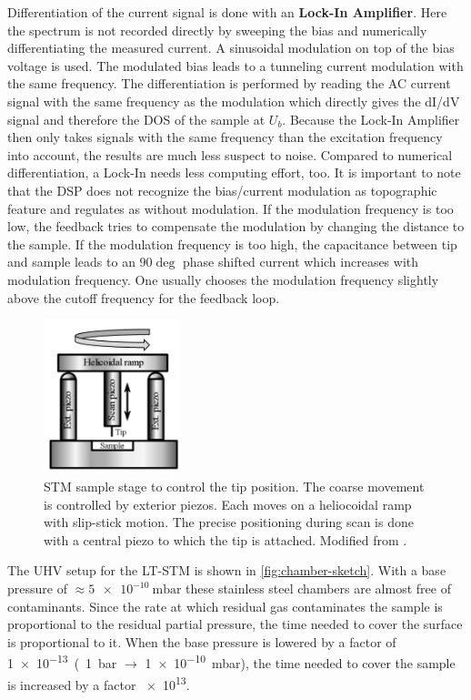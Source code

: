 Differentiation of the current signal is done with an \textbf{Lock-In Amplifier}. Here the spectrum is not recorded directly by sweeping the bias and numerically differentiating the measured current. A sinusoidal modulation on top of the bias voltage %
is used. The modulated bias leads to a tunneling current modulation with the same frequency. The differentiation is performed by reading the AC current signal with the same frequency as the modulation which directly gives the dI/dV signal and therefore the DOS of the sample at $U_b$. Because the Lock-In Amplifier then only takes signals with the same frequency than the excitation frequency into account, the results are much less suspect to noise. Compared to numerical differentiation, a Lock-In needs less computing effort, too. It is important to note that the DSP does not recognize the bias/current modulation as topographic feature and regulates as without modulation. If the modulation frequency is too low, the feedback tries to compensate the modulation by changing the distance to the sample. If the modulation frequency is too high, the capacitance between tip and sample leads to an $90\deg$ phase shifted current which increases with modulation frequency. One usually chooses the modulation frequency slightly above the cutoff frequency for the feedback loop.

\begin{figure} \centering
	\includegraphics[width=4cm]{./images/STM-sketch-2}
	\caption{STM sample stage to control the tip position. The coarse movement is controlled by exterior piezos. Each moves on a heliocoidal ramp with slip-stick motion. The precise positioning during scan is done with a central piezo to which the tip is attached. Modified from \cite{heliocoidal_ramp_2018}.}
	\label{fig:stm-heliocoidal-ramp}
\end{figure}

The UHV setup for the LT-STM is shown in \autoref{fig:chamber-sketch}. With a base pressure of $\approx \SI{5e-10}{\milli \bar}$ these stainless steel chambers are almost free of contaminants. Since the rate at which residual gas contaminates the sample is proportional to the residual partial pressure, the time needed to cover the surface is proportional to it. When the base pressure is lowered by a factor of \SI{1e-13} (\SI{1}{\bar} $\rightarrow$ \SI{1e-10}{\milli \bar}), the time needed to cover the sample is increased by a factor \SI{e13}{}.

